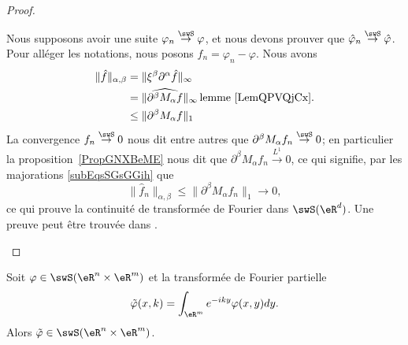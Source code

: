 \begin{proof}
\begin{subproof}
		Nous supposons avoir une suite \( \varphi_n\stackrel{\swS}{\to}\varphi\), et nous devons prouver que \( \hat\varphi_n\stackrel{\swS}{\to}\hat\varphi\). Pour alléger les notations, nous posons \( f_n=\varphi_n-\varphi\). Nous avons
		\begin{subequations}    \label{subEqsSGsGGih}
			\begin{align}
				\| \hat f \|_{\alpha,\beta} & =\| \xi^{\beta}\partial^{\alpha}\hat f \|_{\infty}                                        \\
				                            & =\| \widehat{  \partial^{\beta}M_{\alpha}f  } \|_{\infty}\,\text{lemme~\ref{LemQPVQjCx}.} \\
				                            & \leq \| \partial^{\beta}M_{\alpha}f \|_1
			\end{align}
		\end{subequations}
		La convergence \(f_n\stackrel{\swS}{\to}0\) nous dit entre autres que \( \partial^{\beta}M_{\alpha}f_n\stackrel{\swS}{\to}0\); en particulier la proposition~\ref{PropGNXBeME} nous dit que \( \partial^{\beta}M_{\alpha}f_n\stackrel{L^1}{\to}0\), ce qui signifie, par les majorations \eqref{subEqsSGsGGih} que
		\begin{equation}
			\| \hat f_n \|_{\alpha,\beta}\leq \| \partial^{\beta}M_{\alpha}f_n \|_1\to0,
		\end{equation}
		ce qui prouve la continuité de transformée de Fourier dans \( \swS(\eR^d)\).
		\spitem[Bijection]
		Une preuve peut être trouvée dans \cite{BMoNzTY}.
	\end{subproof}
\end{proof}

\begin{proposition}     \label{PROPooMVQMooGYAzSX}
	Soit \( \varphi\in\swS(\eR^n\times \eR^m)\) et la transformée de Fourier partielle
	\begin{equation}
		\tilde \varphi(x,k)=\int_{\eR^m}  e^{-iky}\varphi(x,y)dy.
	\end{equation}
	Alors \( \tilde \varphi\in\swS(\eR^n\times \eR^m  )\).
\end{proposition}

